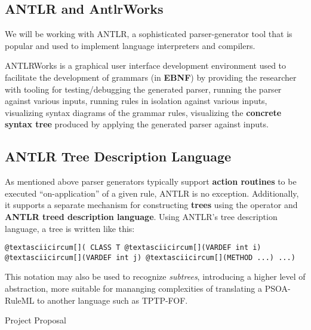 \documentclass[letterpaper,10pt,english]{sphinxmanual}
\begin{document}
\subsection{ANTLR and AntlrWorks}
\label{project-proposal/index:antlr-and-antlrworks}
We will be working with ANTLR, a sophisticated parser-generator tool that is
popular and used to implement language interpreters and compilers.

ANTLRWorks is a graphical user interface development environment used to
facilitate the development of grammars (in \textbf{EBNF}) by providing the researcher
with tooling for testing/debugging the generated parser, running the parser
against various inputs, running rules in isolation against various inputs,
visualizing syntax diagrams of the grammar rules, visualizing the \textbf{concrete
syntax tree} produced by applying the generated parser against inputs.


\subsection{ANTLR Tree Description Language}
\label{project-proposal/index:antlr-tree-description-language}
As mentioned above parser generators typically support \textbf{action routines} to be
executed ``on-application'' of a given rule, ANTLR is no exception.  Additionally,
it supports a separate mechanism for constructing \textbf{trees} using the \code{-\textgreater{}}
operator and \textbf{ANTLR treed description language}.  Using ANTLR’s tree
description language, a tree is written like this:

\begin{Verbatim}[commandchars=@\[\]]
@textasciicircum[]( CLASS T @textasciicircum[](VARDEF int i) @textasciicircum[](VARDEF int j) @textasciicircum[](METHOD ...) ...)
\end{Verbatim}

This notation may also be used to recognize \emph{subtrees}, introducing a higher
level of abstraction, more suitable for mananging complexities of translating a
PSOA-RuleML to another language such as TPTP-FOF.

Project Proposal
\end{document}
